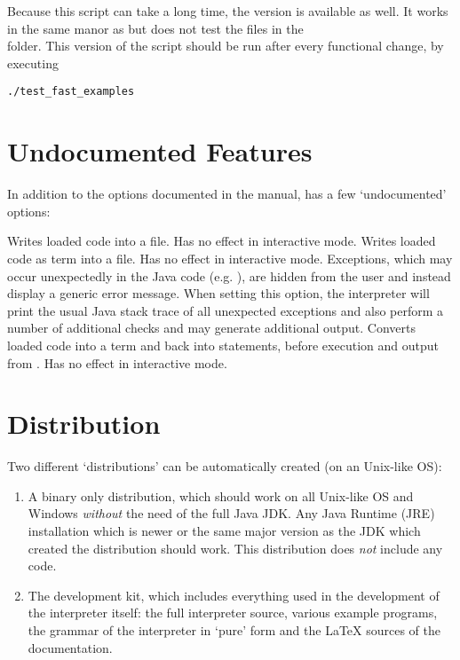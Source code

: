 Because this script can take a long time, the  version is available as well.
It works in the same manor as  but does not test the files in the\\
 folder.
This version of the script should be run after every functional change, by executing

\begin{lstlisting}[frame=none,numbers=none]
./test_fast_examples
\end{lstlisting}

\section{Undocumented Features}

In addition to the options documented in the manual, \setlX{} has a few `undocumented' options:

\begin{itemize}
	      {Writes loaded code into a file. Has no effect in interactive mode.}
	      {Writes loaded code as term into a file. Has no effect in interactive mode.}
	      {Exceptions, which may occur unexpectedly in the Java code (e.g. ), are hidden from the user and instead display a generic error message.
		When setting this option, the interpreter will print the usual Java stack trace of all unexpected exceptions and also perform a number of additional checks and may generate additional output.}
	      {Converts loaded code into a term and back into statements, before execution and output from .  Has no effect in interactive mode.}
\end{itemize}

\section{Distribution}

Two different `distributions' can be automatically created (on an Unix-like OS):

\begin{enumerate}
	\item A binary only distribution, which should work on all Unix-like OS and Windows \emph{without} the need of the full Java JDK.
		Any Java Runtime (JRE) installation which is newer or the same major version as the JDK which created the distribution should work.
		This distribution does \emph{not} include any \SetlX{} code.

	\item The development kit, which includes everything used in the development of the interpreter itself: the full interpreter source, various \SetlX{} example programs, the grammar of the interpreter in `pure' form and the \LaTeX{} sources of the documentation.
\end{enumerate}

